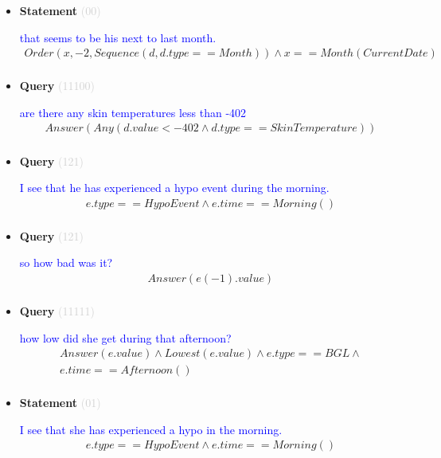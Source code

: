 \documentclass[11pt]{article}
\newcommand{\key}[1]{\textcolor{lightgray}{#1}}
\newcounter{CQuery}
\newcounter{CStatement}
\begin{document}
\begin{itemize}
\item
\textbf{Statement\theCStatement} \key{(00)} \addtocounter{CStatement}{1}
\textcolor{blue}{ that seems to be his next to last month. }
\begin{multline*}
Order(x, -2, Sequence(d, d.type==Month)) \wedge x==Month(CurrentDate) \\ 
\end{multline*}


\item
\textbf{Query\theCQuery} \key{(11100)} \addtocounter{CQuery}{1}
\textcolor{blue}{ are there any skin temperatures less than -402 }
\begin{multline*}
Answer(Any(d.value<-402 \wedge d.type==SkinTemperature)) \\ 
\end{multline*}


\item
\textbf{Query\theCQuery} \key{(121)} \addtocounter{CQuery}{1}
\textcolor{blue}{ I see that he has experienced a hypo event during the morning. }
\begin{multline*}
e.type==HypoEvent \wedge e.time==Morning() \\ 
\end{multline*}


\item
\textbf{Query\theCQuery} \key{(121)} \addtocounter{CQuery}{1}
\textcolor{blue}{ so how bad was it? }
\begin{multline*}
Answer(e(-1).value) \\ 
\end{multline*}


\item
\textbf{Query\theCQuery} \key{(11111)} \addtocounter{CQuery}{1}
\textcolor{blue}{ how low did she get during that afternoon? }
\begin{multline*}
Answer(e.value) \wedge Lowest(e.value) \wedge e.type==BGL \wedge \\ 
e.time==Afternoon() \\ 
\end{multline*}


\item
\textbf{Statement\theCStatement} \key{(01)} \addtocounter{CStatement}{1}
\textcolor{blue}{ I see that she has experienced a hypo in the morning. }
\begin{multline*}
e.type==HypoEvent \wedge e.time==Morning() \\ 
\end{multline*}



\end{itemize}
\end{document}
